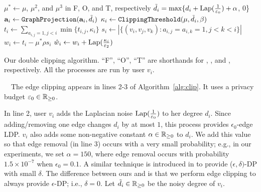 \setlength{\algomargin}{5mm}
\begin{algorithm}[t]
  \SetAlgoLined
  $\mu^* \leftarrow \mu$, $\mu^2$, and $\mu^3$ in F, O, and T, respectively\;
  $\tilde{d}_i = \max\{d_i + \textrm{Lap}(\frac{1}{\varepsilon_0}) + \alpha$, 0\}\;
  $\mathbf{a}_i \leftarrow \texttt{GraphProjection}(\mathbf{a}_i, \tilde{d}_i)$\;
  $\kappa_i \leftarrow \texttt{ClippingThreshold}(\mu, \tilde{d}_i, \beta)$\;
  $t_i \leftarrow \sum_{a_{i,j} = 1, j<i} \min \{t_{i,j}, \kappa_i\}$\;
  $s_i \leftarrow |\{(v_i,v_j,v_k) : a_{i,j} = a_{i,k} = 1, j<k<i\}|$\;
  $w_i \leftarrow t_i - \mu^* \rho s_i$\;
  $\hat{w}_i \leftarrow w_i + \textrm{Lap}(\frac{\kappa_i}{\varepsilon_2})$\;
  \caption{Our double clipping algorithm. 
  ``F'', ``O'', ``T'' are shorthands for 
  \AlgOne{}, \AlgTwo{}, and \AlgThree{}, respectively.
  All the processes are run by user $v_i$.
  }\label{alg:clip}
\end{algorithm}

\smallskip
{}~~The edge clipping appears in lines 2-3 of Algorithm~\ref{alg:clip}. 
It uses a privacy budget $\varepsilon_0 \in \mathbb{R}_{\ge0}$. 

In line 2, user $v_i$ adds the Laplacian noise $\textrm{Lap}(\frac{1}{\varepsilon_0})$ to her degree $d_i$. 
Since adding/removing one edge changes $d_i$ by at most $1$, this process provides $\epsilon_0$-edge LDP. 
$v_i$ also adds some non-negative constant 
$\alpha \in \mathbb{R}_{\ge0}$ 
to $d_i$. 
We add this value so that edge removal (in line 3) occurs with a very small probability; 
e.g., in our experiments, we set $\alpha = 150$, where 
edge removal occurs with probability $1.5 \times 10^{-7}$ when $\epsilon_0 = 0.1$. 
A similar technique is introduced in \cite{Sun_CCS19} to provide ($\epsilon, \delta)$-DP \cite{DP} with small $\delta$. 
The difference between ours and \cite{Sun_CCS19} is that we perform edge clipping 
to always provide $\epsilon$-DP; i.e., $\delta = 0$.
Let $\tilde{d}_i \in \mathbb{R}_{\ge0}$ be the noisy degree of $v_i$.

